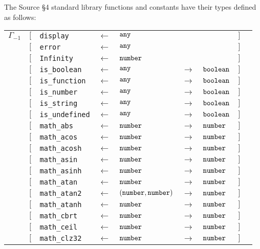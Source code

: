 The Source \S 4 standard library functions and constants have their types defined as follows:

\begin{tabular}[fragile]{lllllllll}
$\Gamma_{-1}$
& $[$ & \texttt{display}      & $\leftarrow$  & $\texttt{any}$ & & & $]$ \\
& $[$ & \texttt{error}      & $\leftarrow$  & $\texttt{any}$ & & & $]$ \\
& $[$ & \texttt{Infinity}      & $\leftarrow$  & $\texttt{number}$ & & & $]$ \\
& $[$ & \texttt{is\_boolean}   & $\leftarrow$  & $\texttt{any}$ & $\rightarrow$ & $\texttt{boolean}$ & $]$ \\
& $[$ & \texttt{is\_function}  & $\leftarrow$  & $\texttt{any}$ & $\rightarrow$ & $\texttt{boolean}$ & $]$ \\
& $[$ & \texttt{is\_number}    & $\leftarrow$  & $\texttt{any}$ & $\rightarrow$ & $\texttt{boolean}$ & $]$ \\
& $[$ & \texttt{is\_string}    & $\leftarrow$  & $\texttt{any}$ & $\rightarrow$ & $\texttt{boolean}$ & $]$ \\
& $[$ & \texttt{is\_undefined} & $\leftarrow$  & $\texttt{any}$ & $\rightarrow$ & $\texttt{boolean}$ & $]$ \\
& $[$ & \texttt{math\_abs} & $\leftarrow$  & $\texttt{number}$ & $\rightarrow$ & $\texttt{number}$ & $]$ \\
& $[$ & \texttt{math\_acos} & $\leftarrow$  & $\texttt{number}$ & $\rightarrow$ & $\texttt{number}$ & $]$ \\
& $[$ & \texttt{math\_acosh} & $\leftarrow$  & $\texttt{number}$ & $\rightarrow$ & $\texttt{number}$ & $]$ \\
& $[$ & \texttt{math\_asin} & $\leftarrow$  & $\texttt{number}$ & $\rightarrow$ & $\texttt{number}$ & $]$ \\
& $[$ & \texttt{math\_asinh} & $\leftarrow$  & $\texttt{number}$ & $\rightarrow$ & $\texttt{number}$ & $]$ \\
& $[$ & \texttt{math\_atan} & $\leftarrow$  & $\texttt{number}$ & $\rightarrow$ & $\texttt{number}$ & $]$ \\
& $[$ & \texttt{math\_atan2} & $\leftarrow$  & $(\texttt{number}, \texttt{number})$ & $\rightarrow$ & $\texttt{number}$ & $]$ \\
& $[$ & \texttt{math\_atanh} & $\leftarrow$  & $\texttt{number}$ & $\rightarrow$ & $\texttt{number}$ & $]$ \\
& $[$ & \texttt{math\_cbrt} & $\leftarrow$  & $\texttt{number}$ & $\rightarrow$ & $\texttt{number}$ & $]$ \\
& $[$ & \texttt{math\_ceil} & $\leftarrow$  & $\texttt{number}$ & $\rightarrow$ & $\texttt{number}$ & $]$ \\
& $[$ & \texttt{math\_clz32} & $\leftarrow$  & $\texttt{number}$ & $\rightarrow$ & $\texttt{number}$ & $]$ \\

\end{tabular}
